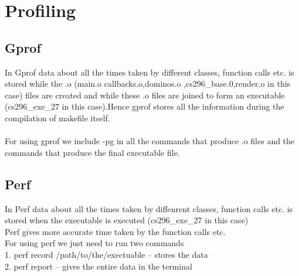 \documentclass{article}
\begin{document}
\section{Profiling}
\subsection{Gprof}
In Gprof data about all the times taken by different classes, function calls etc. is stored while the .o (main.o callbacks.o,dominos.o
,cs296\_base.0,render.o in this case) files are created and while these .o files are joined to form an executable (cs296\_exe\_27 in this case).Hence gprof stores all the information during the compilation of makefile itself.\\ \\
For using gprof we include -pg in all the commands that produce .o files and the commands that produce the 
final executable file.

\subsection{Perf}
In Perf data about all the times taken by diffenrent classes, function calls etc. is stored when the executable is executed (cs296\_exe\_27 in this case) \\
Perf gives more accurate time taken by the function calls etc. \\
For using perf we just need to run two commands \\
1. perf record /path/to/the/exectuable -- stores the data \\
2. perf report -- gives the entire data in the terminal\\\cite{Shivam}
\end{document}

